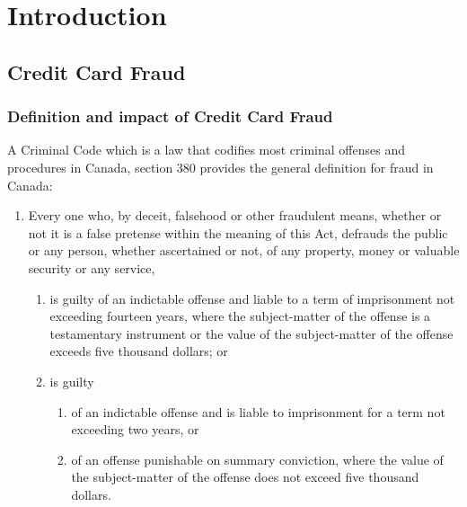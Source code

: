 
\chapter{Introduction}  %

\ifpdf
    \graphicspath{{Chapter1/Figs/Raster/}{Chapter1/Figs/PDF/}{Chapter1/Figs/}}
\else
    \graphicspath{{Chapter1/Figs/Vector/}{Chapter1/Figs/}}
\fi


\section{Credit Card Fraud} %

\subsection{Definition and impact of Credit Card Fraud}

A Criminal Code \citep{criminal380} which is a law that codifies most criminal offenses and procedures in Canada, section 380 provides the general definition for fraud in Canada:

\begin{enumerate}
\item Every one who, by deceit, falsehood or other fraudulent means, whether or not it is a false pretense within the meaning of this Act, defrauds the public or any person, whether ascertained or not, of any property, money or valuable security or any service,

\begin{enumerate}
\item is guilty of an indictable offense and liable to a term of imprisonment not exceeding fourteen years, where the subject-matter of the offense is a testamentary instrument or the value of the subject-matter of the offense exceeds five thousand dollars; or
\item is guilty

\begin{enumerate}
\item of an indictable offense and is liable to imprisonment for a term not exceeding two years, or
\item of an offense punishable on summary conviction, where the value of the subject-matter of the offense does not exceed five thousand dollars.
\end{enumerate}

\end{enumerate}

\end{enumerate}


